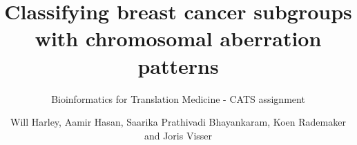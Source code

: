\documentclass{bioinfo}
\begin{document}

\subtitle{Bioinformatics for Translation Medicine - CATS assignment}

\title[CATS assignment]{Classifying breast cancer subgroups with chromosomal aberration patterns}
\author[{}.]{Will Harley, Aamir Hasan, Saarika Prathivadi Bhayankaram, Koen Rademaker and Joris Visser}



\maketitle



\begin{methods}
    
\end{methods}

\begin{results}
    
\end{results}










\end{document}
